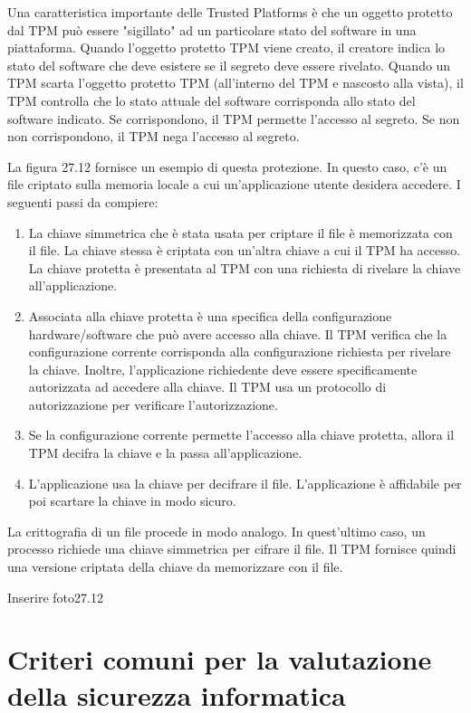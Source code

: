 Una caratteristica importante delle Trusted Platforms è che un oggetto protetto dal TPM può essere "sigillato" ad un particolare stato del software in una piattaforma. Quando l'oggetto protetto TPM viene creato, il creatore indica lo stato del software che deve esistere se il segreto deve essere rivelato. Quando un TPM scarta l'oggetto protetto TPM (all'interno del TPM e nascosto alla vista), il TPM controlla che lo stato attuale del software corrisponda allo stato del software indicato. Se corrispondono, il TPM permette l'accesso al segreto. Se non non corrispondono, il TPM nega l'accesso al segreto.

\singlespacing

La figura 27.12 fornisce un esempio di questa protezione. In questo caso, c'è un file criptato sulla memoria locale a cui un'applicazione utente desidera accedere. I seguenti passi da compiere:
\begin{enumerate}
    \item La chiave simmetrica che è stata usata per criptare il file è memorizzata con il file. La chiave stessa è criptata con un'altra chiave a cui il TPM ha accesso. La chiave protetta è presentata al TPM con una richiesta di rivelare la chiave all'applicazione.
    
    \item Associata alla chiave protetta è una specifica della configurazione hardware/software che può avere accesso alla chiave. Il TPM verifica che la configurazione corrente corrisponda alla configurazione richiesta per rivelare la chiave. Inoltre, l'applicazione richiedente deve essere specificamente autorizzata ad accedere alla chiave. Il TPM usa un protocollo di autorizzazione per verificare l'autorizzazione.
    
    \item Se la configurazione corrente permette l'accesso alla chiave protetta, allora il TPM decifra la chiave e la passa all'applicazione.
    
    \item L'applicazione usa la chiave per decifrare il file. L'applicazione è affidabile per poi scartare la chiave in modo sicuro.
\end{enumerate}
La crittografia di un file procede in modo analogo. In quest'ultimo caso, un processo richiede una chiave simmetrica per cifrare il file. Il TPM fornisce quindi una versione criptata della chiave da memorizzare con il file.

Inserire foto27.12
\section{Criteri comuni per la valutazione della sicurezza informatica}

